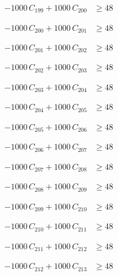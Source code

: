 \documentclass[a4paper,11pt]{article}
\begin{document}
\begin{align}
-1000\,C_{199} + 1000\,C_{200} &\geq 48 \nonumber
\end{align}

\begin{align}
-1000\,C_{200} + 1000\,C_{201} &\geq 48 \nonumber
\end{align}

\begin{align}
-1000\,C_{201} + 1000\,C_{202} &\geq 48 \nonumber
\end{align}

\begin{align}
-1000\,C_{202} + 1000\,C_{203} &\geq 48 \nonumber
\end{align}

\begin{align}
-1000\,C_{203} + 1000\,C_{204} &\geq 48 \nonumber
\end{align}

\begin{align}
-1000\,C_{204} + 1000\,C_{205} &\geq 48 \nonumber
\end{align}

\begin{align}
-1000\,C_{205} + 1000\,C_{206} &\geq 48 \nonumber
\end{align}

\begin{align}
-1000\,C_{206} + 1000\,C_{207} &\geq 48 \nonumber
\end{align}

\begin{align}
-1000\,C_{207} + 1000\,C_{208} &\geq 48 \nonumber
\end{align}

\begin{align}
-1000\,C_{208} + 1000\,C_{209} &\geq 48 \nonumber
\end{align}

\begin{align}
-1000\,C_{209} + 1000\,C_{210} &\geq 48 \nonumber
\end{align}

\begin{align}
-1000\,C_{210} + 1000\,C_{211} &\geq 48 \nonumber
\end{align}

\begin{align}
-1000\,C_{211} + 1000\,C_{212} &\geq 48 \nonumber
\end{align}

\begin{align}
-1000\,C_{212} + 1000\,C_{213} &\geq 48 \nonumber
\end{align}
\end{document}
